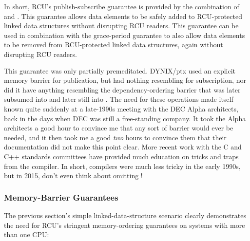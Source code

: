 In short, RCU's publish-subscribe guarantee is provided by the
combination of  and .
This
guarantee allows data elements to be safely added to RCU-protected
linked data structures without disrupting RCU readers.
This guarantee
can be used in combination with the grace-period guarantee to also allow
data elements to be removed from RCU-protected linked data structures,
again without disrupting RCU readers.

This guarantee was only partially premeditated.
DYNIX/ptx used an
explicit memory barrier for publication, but had nothing resembling
 for subscription, nor did it have anything
resembling the dependency-ordering barrier that was later subsumed
into  and later still into .
The
need for these operations made itself known quite suddenly at a
late-1990s meeting with the DEC Alpha architects, back in the days when
DEC was still a free-standing company.
It took the Alpha architects a
good hour to convince me that any sort of barrier would ever be needed,
and it then took me a good \emph{two} hours to convince them that their
documentation did not make this point clear.
More recent work with the C
and C++ standards committees have provided much education on tricks and
traps from the compiler.
In short, compilers were much less tricky in
the early 1990s, but in 2015, don't even think about omitting
!


\subsubsection{Memory-Barrier Guarantees}

The previous section's simple linked-data-structure scenario clearly
demonstrates the need for RCU's stringent memory-ordering guarantees on
systems with more than one CPU\@:

